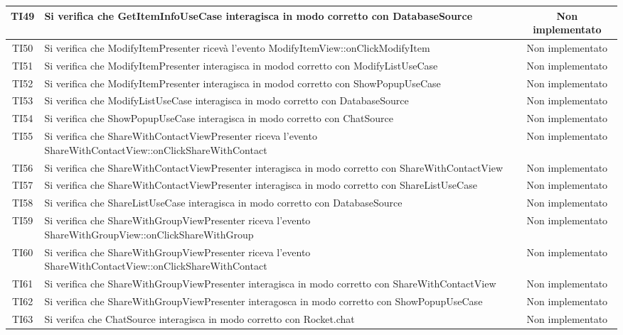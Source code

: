 \begin{center}
\begin{longtable}{|c|>{\centering}m{10cm}|c|}
		TI49 & Si verifica che GetItemInfoUseCase interagisca in modo corretto con DatabaseSource & Non implementato \\ \hline
		TI50 & Si verifica che ModifyItemPresenter ricevà l'evento ModifyItemView::onClickModifyItem & Non implementato \\ \hline
		TI51 & Si verifica che ModifyItemPresenter interagisca in modod corretto con ModifyListUseCase & Non implementato \\ \hline
		TI52 & Si verifica che ModifyItemPresenter interagisca in modod corretto con ShowPopupUseCase & Non implementato \\ \hline
		TI53 & Si verifica che ModifyListUseCase interagisca in modo corretto con DatabaseSource & Non implementato \\ \hline
		TI54 & Si verifica che ShowPopupUseCase interagisca in modo corretto con ChatSource & Non implementato \\ \hline
		TI55 & Si verifica che ShareWithContactViewPresenter riceva l'evento ShareWithContactView::onClickShareWithContact & Non implementato \\ \hline
		TI56 & Si verifica che ShareWithContactViewPresenter interagisca in modo corretto con ShareWithContactView & Non implementato \\ \hline
		TI57 & Si verifica che ShareWithContactViewPresenter interagisca in modo corretto con ShareListUseCase & Non implementato \\ \hline
		TI58 & Si verifica che ShareListUseCase interagisca in modo corretto con DatabaseSource & Non implementato \\ \hline
		TI59 & Si verifica che ShareWithGroupViewPresenter riceva l'evento ShareWithGroupView::onClickShareWithGroup & Non implementato \\ \hline
		TI60 & Si verifica che ShareWithGroupViewPresenter riceva l'evento ShareWithContactView::onClickShareWithContact & Non implementato \\ \hline
		TI61 & Si verifica che ShareWithGroupViewPresenter interagisca in modo corretto con ShareWithContactView & Non implementato \\ \hline
		TI62 & Si verifica che ShareWithGroupViewPresenter interagosca in modo corretto con ShowPopupUseCase & Non implementato \\ \hline
		TI63 & Si verifca che ChatSource interagisca in modo corretto con Rocket.chat & Non implementato \\ \hline
	\end{longtable}
\end{center}
